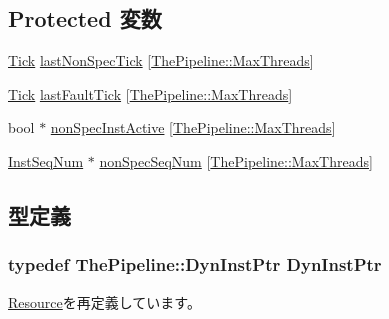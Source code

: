 \subsection*{Protected 変数}
\begin{DoxyCompactItemize}
\item 
\hyperlink{base_2types_8hh_a5c8ed81b7d238c9083e1037ba6d61643}{Tick} \hyperlink{classGraduationUnit_a0ecb66fa77b766d3a2dcf951d7d592a2}{lastNonSpecTick} \mbox{[}\hyperlink{namespaceThePipeline_ac9c0bbe9cf27d93e08ea8ccc4096e633}{ThePipeline::MaxThreads}\mbox{]}
\item 
\hyperlink{base_2types_8hh_a5c8ed81b7d238c9083e1037ba6d61643}{Tick} \hyperlink{classGraduationUnit_a06338b6a229a01ba08102d38224d0fbf}{lastFaultTick} \mbox{[}\hyperlink{namespaceThePipeline_ac9c0bbe9cf27d93e08ea8ccc4096e633}{ThePipeline::MaxThreads}\mbox{]}
\item 
bool $\ast$ \hyperlink{classGraduationUnit_aa27d1c9b589af0c77a81c490021c7dcb}{nonSpecInstActive} \mbox{[}\hyperlink{namespaceThePipeline_ac9c0bbe9cf27d93e08ea8ccc4096e633}{ThePipeline::MaxThreads}\mbox{]}
\item 
\hyperlink{inst__seq_8hh_a258d93d98edaedee089435c19ea2ea2e}{InstSeqNum} $\ast$ \hyperlink{classGraduationUnit_a899b1bc10d38a0f725495bf2108479a3}{nonSpecSeqNum} \mbox{[}\hyperlink{namespaceThePipeline_ac9c0bbe9cf27d93e08ea8ccc4096e633}{ThePipeline::MaxThreads}\mbox{]}
\end{DoxyCompactItemize}


\subsection{型定義}
\hypertarget{classGraduationUnit_af9d0c8a46736ba6aa2d8bb94da1a5e73}{
\subsubsection[{DynInstPtr}]{\setlength{\rightskip}{0pt plus 5cm}typedef {\bf ThePipeline::DynInstPtr} {\bf DynInstPtr}}}
\label{classGraduationUnit_af9d0c8a46736ba6aa2d8bb94da1a5e73}


\hyperlink{classResource_af9d0c8a46736ba6aa2d8bb94da1a5e73}{Resource}を再定義しています。

